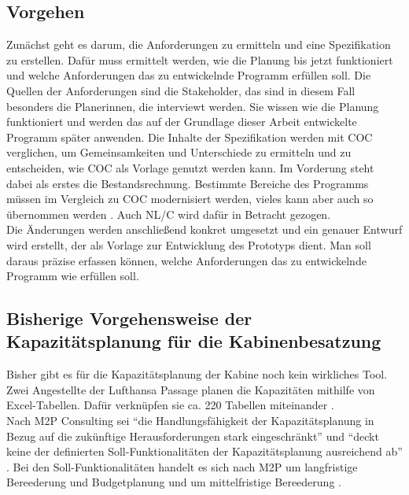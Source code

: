 \documentclass [12pt, a4paper, oneside, titlepage, ngerman]{article}
\begin{document}
\subsection {Vorgehen}
Zunächst geht es darum, die Anforderungen zu ermitteln und eine Spezifikation zu erstellen. Dafür muss ermittelt werden, wie die Planung bis jetzt funktioniert und welche Anforderungen das zu entwickelnde Programm erfüllen soll. Die Quellen der Anforderungen sind die Stakeholder, das sind in diesem Fall besonders die Planerinnen, die interviewt werden. Sie wissen wie die Planung funktioniert und werden das auf der Grundlage dieser Arbeit entwickelte Programm später anwenden. Die Inhalte der Spezifikation werden mit \ac{COC} verglichen, um Gemeinsamkeiten und Unterschiede zu ermitteln und zu entscheiden, wie \ac{COC} als Vorlage genutzt werden kann. Im Vorderung steht dabei als erstes die Bestandsrechnung. Bestimmte Bereiche des Programms müssen im Vergleich zu \ac{COC} modernisiert werden, vieles kann aber auch so übernommen werden \cite[vgl.][]{Gespraech1}. Auch \ac{NL/C} wird dafür in Betracht gezogen. \\
Die Änderungen werden anschließend konkret umgesetzt und ein genauer Entwurf wird erstellt, der als Vorlage zur Entwicklung des Prototyps dient. Man soll daraus präzise erfassen können, welche Anforderungen das zu entwickelnde Programm wie erfüllen soll.

\subsection{Bisherige Vorgehensweise der Kapazitätsplanung für die Kabinenbesatzung}
Bisher gibt es für die Kapazitätsplanung der Kabine noch kein wirkliches Tool. Zwei Angestellte der Lufthansa Passage planen die Kapazitäten mithilfe von Excel-Tabellen. Dafür verknüpfen sie ca. 220 Tabellen miteinander \cite[vgl.][]{Gespraech2}. \\ %
Nach M2P Consulting sei "`die Handlungsfähigkeit der Kapazitätsplanung in Bezug auf die zukünftige Herausforderungen stark eingeschränkt"' \cite[S.5]{M2P} und "`deckt keine der definierten Soll-Funktionalitäten der Kapazitätsplanung ausreichend ab"' \cite[S.6]{M2P}. Bei den Soll-Funktionalitäten handelt es sich nach M2P um langfristige Bereederung und Budgetplanung und um mittelfristige Bereederung \cite[vgl.][S.6]{M2P}.
\end{document}
